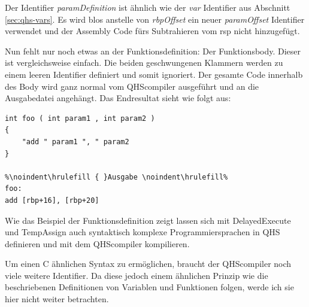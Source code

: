 Der Identifier \textit{paramDefinition} ist ähnlich wie der \textit{var} Identifier aus Abschnitt \ref{sec:qhs-vars}.
Es wird blos anstelle von \textit{rbpOffset} ein neuer \textit{paramOffset} Identifier verwendet und der Assembly Code fürs Subtrahieren vom rsp nicht hinzugefügt.

Nun fehlt nur noch etwas an der Funktionsdefinition: Der Funktionsbody. Dieser ist vergleichsweise einfach. Die beiden geschwungenen Klammern werden zu einem leeren Identifier definiert und somit ignoriert.
Der gesamte Code innerhalb des Body wird ganz normal vom QHScompiler ausgeführt und an die Ausgabedatei angehängt. Das Endresultat sieht wie folgt aus:

\begin{lstlisting}[language=QHS, caption=Finale Definition einer Funktion in QHS]
%\noindent\hrulefill { }Eingabe \noindent\hrulefill%
int foo ( int param1 , int param2 )
{
    "add " param1 ", " param2
}

%\noindent\hrulefill { }Ausgabe \noindent\hrulefill%
foo:
add [rbp+16], [rbp+20]
\end{lstlisting}

Wie das Beispiel der Funktionsdefinition zeigt lassen sich mit DelayedExecute und TempAssign auch syntaktisch komplexe Programmiersprachen in QHS definieren und mit dem QHScompiler kompilieren.

Um einen C ähnlichen Syntax zu ermöglichen, braucht der QHScompiler noch viele weitere Identifier.
Da diese jedoch einem ähnlichen Prinzip wie die beschriebenen Definitionen von Variablen und Funktionen folgen, werde ich sie hier nicht weiter betrachten.


    






